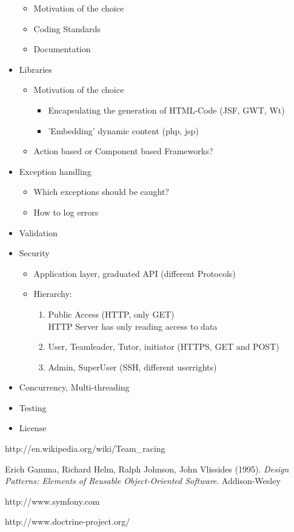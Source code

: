\documentclass[11pt]{article}
\begin{document}
\begin{itemize}
\begin{itemize}
		\item Motivation of the choice
		\item Coding Standards
		\item Documentation
		\end{itemize}
	\item Libraries
		\begin{itemize}
		\item Motivation of the choice
			\begin{itemize}
			\item Encapsulating the generation of HTML-Code (JSF, GWT, Wt)
			\item 'Embedding' dynamic content (php, jsp)
			\end{itemize}
		\item Action based or Component based Frameworks?
		\end{itemize}
	\item Exception handling
		\begin{itemize}
		\item Which exceptions should be caught?
		\item How to log errors
		\end{itemize}
	\item Validation
	\item Security
		\begin{itemize}
		\item Application layer, graduated API (different Protocols)
		\item Hierarchy:
			\begin{enumerate}
			\item Public Access (HTTP, only GET)
			\\HTTP Server has only reading access to data
			\item User, Teamleader, Tutor, initiator (HTTPS, GET and POST)
			\item Admin, SuperUser (SSH, different userrights)
			\end{enumerate}
		\end{itemize}
	\item Concurrency, Multi-threading
	\item Testing
	\item License
	\end{itemize}



\begin{thebibliography}{9}

http://en.wikipedia.org/wiki/Team\_racing
  
Erich Gamma, Richard Helm, Ralph Johnson, John Vlissides (1995).
\emph{Design Patterns: Elements of Reusable Object-Oriented Software}.
Addison-Wesley
  
http://www.symfony.com

http://www.doctrine-project.org/

\end{thebibliography}
\end{document}
